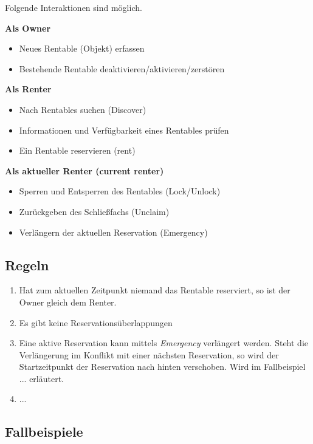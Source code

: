 \vspace{1em}\noindent
Folgende Interaktionen sind möglich.

\vspace{1em}\noindent
\textbf{Als Owner}
\begin{itemize}
    \item Neues Rentable (Objekt) erfassen
    \item Bestehende Rentable deaktivieren/aktivieren/zerstören
\end{itemize}

\vspace{1em}\noindent
\textbf{Als Renter}
\begin{itemize}
    \item Nach Rentables suchen (Discover)
    \item Informationen und Verfügbarkeit eines Rentables prüfen
    \item Ein Rentable reservieren (rent)
\end{itemize}

\vspace{1em}\noindent
\textbf{Als aktueller Renter (current renter)}
\begin{itemize}
    \item Sperren und Entsperren des Rentables (Lock/Unlock)
    \item Zurückgeben des Schließfachs (Unclaim)
    \item Verlängern der aktuellen Reservation (Emergency)
\end{itemize}

\subsection{Regeln}
\begin{enumerate}
    \item Hat zum aktuellen Zeitpunkt niemand das Rentable reserviert, so ist der Owner gleich dem Renter.
    \item Es gibt keine Reservationsüberlappungen
    \item Eine aktive Reservation kann mittels \emph{Emergency} verlängert werden. Steht die Verlängerung im Konflikt mit einer nächsten Reservation, so wird der Startzeitpunkt der Reservation nach hinten verschoben. Wird im Fallbeispiel ... erläutert.
    \item ...
\end{enumerate}


\subsection{Fallbeispiele}

